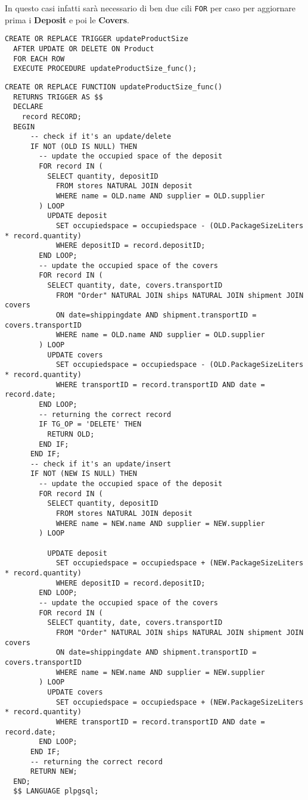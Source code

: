 In questo casi infatti sarà necessario di ben due cili \lstinline{FOR} per caso per aggiornare prima i \textbf{Deposit} e poi le \textbf{Covers}.

\begin{lstlisting}[caption={Trigger per implementare \textbf{updateProductSize}}]
  CREATE OR REPLACE TRIGGER updateProductSize
  AFTER UPDATE OR DELETE ON Product
  FOR EACH ROW
  EXECUTE PROCEDURE updateProductSize_func();
\end{lstlisting}

\begin{lstlisting}[caption={Funzione \textbf{updateProductSize}}]
  CREATE OR REPLACE FUNCTION updateProductSize_func()
  RETURNS TRIGGER AS $$
  DECLARE
    record RECORD;
  BEGIN
      -- check if it's an update/delete
      IF NOT (OLD IS NULL) THEN
        -- update the occupied space of the deposit
        FOR record IN (
          SELECT quantity, depositID
            FROM stores NATURAL JOIN deposit
            WHERE name = OLD.name AND supplier = OLD.supplier
        ) LOOP
          UPDATE deposit
            SET occupiedspace = occupiedspace - (OLD.PackageSizeLiters * record.quantity)
            WHERE depositID = record.depositID;
        END LOOP;
        -- update the occupied space of the covers
        FOR record IN (
          SELECT quantity, date, covers.transportID
            FROM "Order" NATURAL JOIN ships NATURAL JOIN shipment JOIN covers
            ON date=shippingdate AND shipment.transportID = covers.transportID
            WHERE name = OLD.name AND supplier = OLD.supplier
        ) LOOP
          UPDATE covers
            SET occupiedspace = occupiedspace - (OLD.PackageSizeLiters * record.quantity)
            WHERE transportID = record.transportID AND date = record.date;
        END LOOP;
        -- returning the correct record
        IF TG_OP = 'DELETE' THEN
          RETURN OLD;
        END IF;
      END IF;
      -- check if it's an update/insert
      IF NOT (NEW IS NULL) THEN
        -- update the occupied space of the deposit
        FOR record IN (
          SELECT quantity, depositID
            FROM stores NATURAL JOIN deposit
            WHERE name = NEW.name AND supplier = NEW.supplier
        ) LOOP
    
          UPDATE deposit
            SET occupiedspace = occupiedspace + (NEW.PackageSizeLiters * record.quantity)
            WHERE depositID = record.depositID;
        END LOOP;
        -- update the occupied space of the covers
        FOR record IN (
          SELECT quantity, date, covers.transportID
            FROM "Order" NATURAL JOIN ships NATURAL JOIN shipment JOIN covers
            ON date=shippingdate AND shipment.transportID = covers.transportID
            WHERE name = NEW.name AND supplier = NEW.supplier
        ) LOOP
          UPDATE covers
            SET occupiedspace = occupiedspace + (NEW.PackageSizeLiters * record.quantity)
            WHERE transportID = record.transportID AND date = record.date;
        END LOOP;
      END IF;
      -- returning the correct record
      RETURN NEW;
  END;
  $$ LANGUAGE plpgsql;
\end{lstlisting}